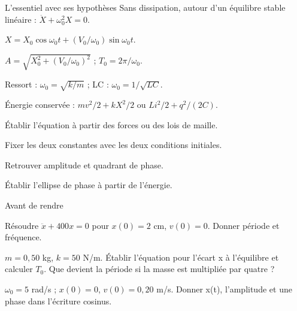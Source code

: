 \begin{loi}{L’essentiel avec ses hypothèses}
Sans dissipation, autour d’un équilibre stable linéaire : $\ddot X+\omega_0^2X=0$.\par $X=X_0\cos\omega_0t+(V_0/\omega_0)\sin\omega_0t$.\par $A=\sqrt{X_0^2+(V_0/\omega_0)^2}$ ; $T_0=2\pi/\omega_0$.\par Ressort : $\omega_0=\sqrt{k/m}$ ; LC : $\omega_0=1/\sqrt{LC}$.\par Énergie conservée : $mv^2/2+kX^2/2$ ou $Li^2/2+q^2/(2C)$.
\end{loi}
\begin{questions}
\item Établir l’équation à partir des forces ou des lois de maille.
\item Fixer les deux constantes avec les deux conditions initiales.
\item Retrouver amplitude et quadrant de phase.
\item Établir l’ellipse de phase à partir de l’énergie.
\end{questions}

\begin{docu}{Avant de rendre}
\end{docu}


\begin{questions}
\item Résoudre $\ddot x+400x=0$ pour $x(0)=2$ cm, $v(0)=0$. Donner période et fréquence.
\end{questions}

\begin{questions}
\item $m=0{,}50$ kg, $k=50$ N/m. Établir l’équation pour l’écart x à l’équilibre et calculer $T_0$. Que devient la période si la masse est multipliée par quatre ?
\end{questions}

\begin{questions}
\item $\omega_0=5$ rad/s ; $x(0)=0$, $v(0)=0{,}20$ m/s. Donner x(t), l’amplitude et une phase dans l’écriture cosinus.
\end{questions}



